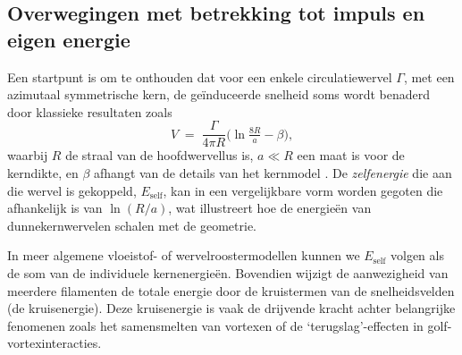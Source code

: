 \subsection{Overwegingen met betrekking tot impuls en eigen energie}
\label{sec:impuls}
Een startpunt is om te onthouden dat voor een enkele circulatiewervel $\Gamma$, met een
azimutaal symmetrische kern, de geïnduceerde snelheid soms wordt benaderd door
klassieke resultaten zoals
\begin{equation}
V \;=\; \frac{\Gamma}{4 \pi R}
\bigl(\ln \tfrac{8 R}{a} - \beta \bigr),\label{eq:appendix:velocity}
\end{equation}
waarbij $R$ de straal van de hoofdwervellus is, $a \ll R$ een maat is voor de kerndikte,
en $\beta$ afhangt van de details van het kernmodel \cite{Saffman1992}. De
\emph{zelfenergie} die aan die wervel is gekoppeld, $E_{\text{self}}$, kan in een
vergelijkbare vorm worden gegoten die afhankelijk is van $\ln(R/a)$, wat illustreert hoe de energieën van dunnekernwervelen
schalen met de geometrie.

In meer algemene vloeistof- of wervelroostermodellen kunnen we $E_{\text{self}}$ volgen als de
som van de individuele kernenergieën. Bovendien wijzigt de aanwezigheid van meerdere filamenten
de totale energie door de kruistermen van de snelheidsvelden (de kruisenergie). Deze
kruisenergie is vaak de drijvende kracht achter belangrijke fenomenen zoals het samensmelten van vortexen of de `terugslag'-effecten
in golf-vortexinteracties.

